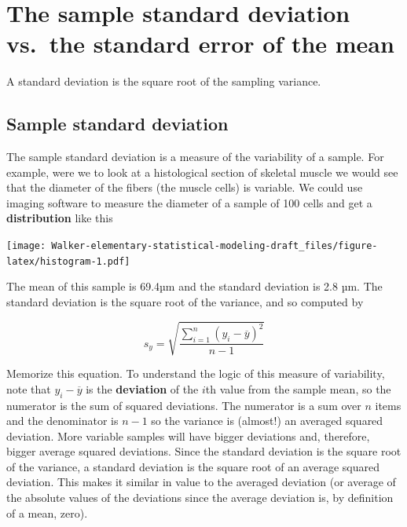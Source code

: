 \documentclass[]{book}
\begin{document}
\hypertarget{the-sample-standard-deviation-vs.-the-standard-error-of-the-mean}{%
\section{The sample standard deviation vs.~the standard error of the mean}\label{the-sample-standard-deviation-vs.-the-standard-error-of-the-mean}}

A standard deviation is the square root of the sampling variance.

\hypertarget{sample-standard-deviation}{%
\subsection{Sample standard deviation}\label{sample-standard-deviation}}

The sample standard deviation is a measure of the variability of a sample. For example, were we to look at a histological section of skeletal muscle we would see that the diameter of the fibers (the muscle cells) is variable. We could use imaging software to measure the diameter of a sample of 100 cells and get a \textbf{distribution} like this

\texttt{[image: Walker-elementary-statistical-modeling-draft\_files/figure-latex/histogram-1.pdf]}

The mean of this sample is 69.4µm and the standard deviation is 2.8 µm. The standard deviation is the square root of the variance, and so computed by

\begin{equation}
s_y = \sqrt{\frac{\sum_{i=1}^n{(y_i - \overline{y})^2}}{n-1}}
\label{eq:variance}
\end{equation}

Memorize this equation. To understand the logic of this measure of variability, note that \(y_i - \overline{y}\) is the \textbf{deviation} of the \(i\)th value from the sample mean, so the numerator is the sum of squared deviations. The numerator is a sum over \(n\) items and the denominator is \(n-1\) so the variance is (almost!) an averaged squared deviation. More variable samples will have bigger deviations and, therefore, bigger average squared deviations. Since the standard deviation is the square root of the variance, a standard deviation is the square root of an average squared deviation. This makes it similar in value to the averaged deviation (or average of the absolute values of the deviations since the average deviation is, by definition of a mean, zero).
\end{document}
